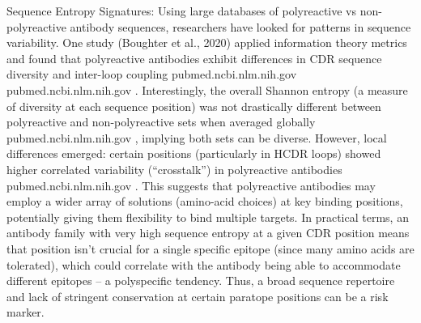 Sequence Entropy Signatures: Using large databases of polyreactive vs non-polyreactive antibody sequences, researchers have looked for patterns in sequence variability. One study (Boughter et al., 2020) applied information theory metrics and found that polyreactive antibodies exhibit differences in CDR sequence diversity and inter-loop coupling
pubmed.ncbi.nlm.nih.gov
pubmed.ncbi.nlm.nih.gov
. Interestingly, the overall Shannon entropy (a measure of diversity at each sequence position) was not drastically different between polyreactive and non-polyreactive sets when averaged globally
pubmed.ncbi.nlm.nih.gov
, implying both sets can be diverse. However, local differences emerged: certain positions (particularly in HCDR loops) showed higher correlated variability (“crosstalk”) in polyreactive antibodies
pubmed.ncbi.nlm.nih.gov
. This suggests that polyreactive antibodies may employ a wider array of solutions (amino-acid choices) at key binding positions, potentially giving them flexibility to bind multiple targets. In practical terms, an antibody family with very high sequence entropy at a given CDR position means that position isn’t crucial for a single specific epitope (since many amino acids are tolerated), which could correlate with the antibody being able to accommodate different epitopes – a polyspecific tendency. Thus, a broad sequence repertoire and lack of stringent conservation at certain paratope positions can be a risk marker.

